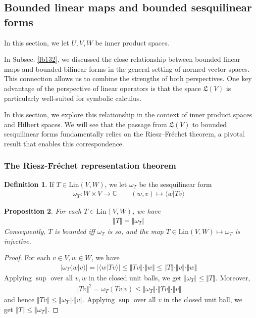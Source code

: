 \documentclass[12pt,b5paper,notitlepage]{article}
\theoremstyle{definition}
\newtheorem{df}{Definition}[subsection]
\theoremstyle{plain}
\newtheorem{pp}[df]{Proposition}
\newcommand{\fk}{\mathfrak}
\newcommand{\bk}[1]{\langle {#1}\rangle}
\newcommand{\Cbb}{\mathbb C}
\newcommand{\Lin}{\mathrm{Lin}}
\numberwithin{equation}{section}
\begin{document}
\subsection{Bounded linear maps and bounded sesquilinear forms}



In this section, we let $U,V,W$ be inner product spaces.



In Subsec. \ref{lb132}, we discussed the close relationship between bounded linear maps and bounded bilinear forms in the general setting of normed vector spaces. This connection allows us to combine the strengths of both perspectives. One key advantage of the perspective of linear operators is that the space $\fk L(V)$ is particularly well-suited for symbolic calculus.


In this section, we explore this relationship in the context of inner product spaces and Hilbert spaces. We will see that the passage from $\fk L(V)$ to bounded sesquilinear forms fundamentally relies on the Riesz–Fréchet theorem, a pivotal result that enables this correspondence.


\subsubsection{The Riesz-Fr\'echet representation theorem}


\begin{df}
If $T\in\Lin(V,W)$, we let $\omega_T$ be the sesquilinear form 
\begin{gather*}
\omega_T:W\times V\rightarrow\Cbb \qquad (w,v)\mapsto \bk{w|Tv}
\end{gather*}
\end{df}

\begin{pp}\label{lb133}
For each $T\in\Lin(V,W)$, we have
\begin{align*}
\Vert T\Vert=\Vert\omega_T\Vert
\end{align*}
Consequently, $T$ is bounded iff $\omega_T$ is so, and the map $T\in\Lin(V,W)\mapsto \omega_T$ is injective.
\end{pp}



\begin{proof}
For each $v\in V,w\in W$, we have
\begin{align*}
|\omega_T(w|v)|=|\bk{w|Tv}|\leq\Vert Tv\Vert\cdot\Vert w\Vert\leq \Vert T\Vert\cdot\Vert v\Vert\cdot\Vert w\Vert
\end{align*}
Applying $\sup$ over all $v,w$ in the closed unit balls, we get $\Vert\omega_T\Vert\leq\Vert T\Vert$. Moreover,
\begin{align*}
\Vert Tv\Vert^2=\omega_T(Tv|v)\leq\Vert \omega_T\Vert\cdot \Vert Tv\Vert\cdot\Vert v\Vert
\end{align*}
and hence $\Vert Tv\Vert\leq \Vert\omega_T\Vert\cdot\Vert v\Vert$. Applying $\sup$ over all $v$ in the closed unit ball, we get $\Vert T\Vert\leq\Vert\omega_T\Vert$.
\end{proof}
\end{document}
